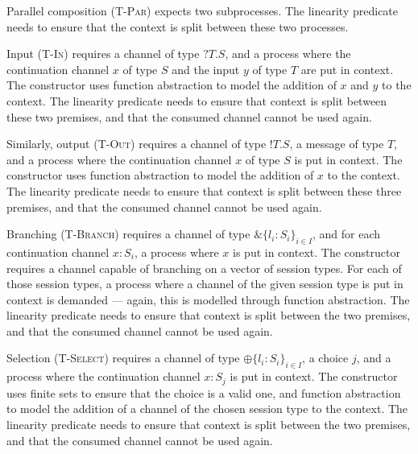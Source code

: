 \documentclass{mproj}
\newcommand{\Send}[1]{!#1.}
\newcommand{\Recv}[1]{?#1.}
\newcommand{\Select}{\oplus}
\newcommand{\Branch}{\&}
\begin{document}

Parallel composition (\textsc{T-Par}) expects two subprocesses. The linearity predicate needs to ensure that the context is split between these two processes.


Input (\textsc{T-In}) requires a channel of type $\Recv{T}S$, and a process where the continuation channel $x$ of type $S$ and the input $y$ of type $T$ are put in context. The  constructor uses function abstraction to model the addition of $x$ and $y$ to the context. The linearity predicate needs to ensure that context is split between these two premises, and that the consumed channel cannot be used again.


Similarly, output (\textsc{T-Out}) requires a channel of type $\Send{T}S$, a message of type $T$, and a process where the continuation channel $x$ of type $S$ is put in context. The  constructor uses function abstraction to model the addition of $x$ to the context. The linearity predicate needs to ensure that context is split between these three premises, and that the consumed channel cannot be used again.


Branching (\textsc{T-Branch}) requires a channel of type $\Branch \{l_i : S_i\}_{i \in I}$, and for each continuation channel $x : S_i$, a process where $x$ is put in context. The  constructor requires a channel capable of branching on a vector of session types. For each of those session types, a process where a channel of the given session type is put in context is demanded --- again, this is modelled through function abstraction. The linearity predicate needs to ensure that context is split between the two premises, and that the consumed channel cannot be used again.


Selection (\textsc{T-Select}) requires a channel of type $\Select \{l_i : S_i\}_{i \in I}$, a choice $j$, and a process where the continuation channel $x : S_j$ is put in context. The  constructor uses finite sets to ensure that the choice is a valid one, and function abstraction to model the addition of a channel of the chosen session type to the context. The linearity predicate needs to ensure that context is split between the two premises, and that the consumed channel cannot be used again.
\end{document}
